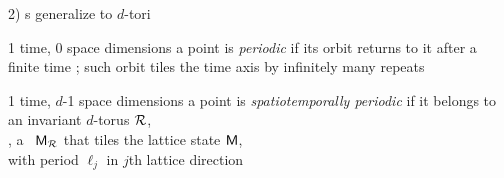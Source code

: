 \begin{frame}{2) \po s generalize to $d$-tori}


\begin{block}{1 time, 0 space dimensions}
a {\statesp} point is {\em periodic} if its orbit returns to it
after a finite time \period{}; such orbit tiles the time axis
by infinitely many repeats
\end{block}

\bigskip

\begin{block}{1 time, $d$-1 space dimensions}
 a {\statesp} point is {\em spatiotemporally periodic} if
it belongs to \\ an invariant $d$-torus ${\mathcal{R}}$,\\
\ie, a \brick\ $\mathsf{M}_{\mathcal{R}}$ that
tiles the lattice state  $\mathsf{M}$, \\
with period $\ell_j$ in $j$th lattice direction
\end{block}
\end{frame}

